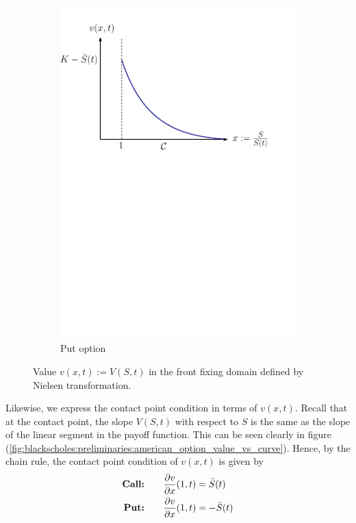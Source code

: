 \begin{figure}[H]
\begin{subfigure}{0.45\textwidth}
    \includegraphics[width=\textwidth]{chapters/chapter2/NielsenPutOption}
    \caption{Put option}
    \label{fig:blackscholes:frontfixingmethod:nielsen_put_value_vs_curve}
  \end{subfigure}
  \caption{Value $v(x,t) := V(S,t)$ in the front fixing domain defined by Nielsen transformation.}
  \label{fig:blackscholes:frontfixingmethod:nielsen_value_vs_curve}
\end{figure}
Likewise, we express the contact point condition in terms of $v(x,t)$. Recall that at the contact point, the slope $V(S,t)$ with respect to $S$ is the same as the slope of the linear segment in the payoff function. This can be seen clearly in figure (\ref{fig:blackscholes:preliminaries:american_option_value_vs_curve}). Hence, by the chain rule, the contact point condition of $v(x,t)$ is given by
\begin{subequations} \label{eq:blackscholes:frontfixingmethod:nielsen:american_options_optimal_price_contact_point_condition}
  \begin{align}
    \text{\textbf{Call:}} \qquad & \dfrac{\partial v}{\partial x}(1, t) = \bar{S}(t) \\
    \text{\textbf{Put:}} \qquad & \dfrac{\partial v}{\partial x}(1, t) = -\bar{S}(t)
  \end{align}
\end{subequations}
